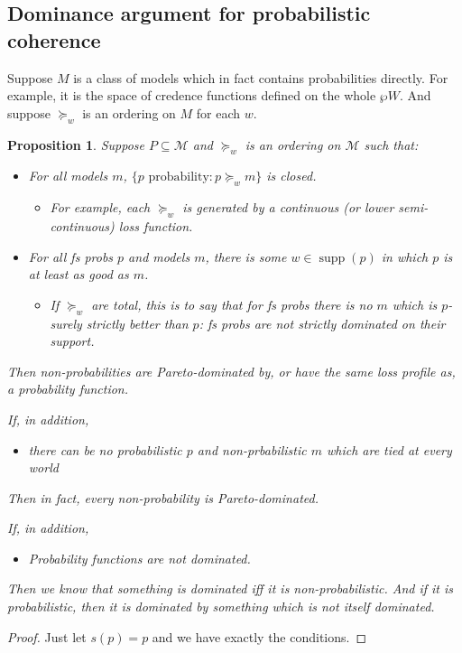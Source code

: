 \documentclass[11pt]{article}
\newtheorem{proposition}[theorem]{Proposition}
\theoremstyle{definition}
\theoremstyle{remark}
\newcommand{\M}{\mathcal M}
\newcommand{\supp}{\operatorname{supp}}
\begin{document}
\newpage\color{red}




\subsection{Dominance argument for probabilistic coherence}


Suppose $M$ is a class of models which in fact contains probabilities directly. For example, it is the space of credence functions defined on the whole $\wp{W}$. And suppose $\succeq_w$ is an ordering on $M$ for each $w$. 
\begin{proposition}
	Suppose $P\subseteq\M$ and $\succeq_w$ is an ordering on $\M$ such that:
	\begin{itemize}
		\item For all models $m$, $\{p\text{ probability} : p\succeq_w m\}$ is closed. 
		\begin{itemize}
			\item For example, each $\succeq_w$ is generated by a continuous (or lower semi-continuous) loss function.
		\end{itemize}
	\item For all fs probs $p$ and models $m$, there is some $w\in\supp(p)$ in which $p$ is at least as good as $m$. 
		\begin{itemize}
			\item If $\succeq_w$ are total, this is to say that for fs probs there is no $m$ which is $p$-surely strictly better than $p$: fs probs are not strictly dominated on their support. 
		\end{itemize}
	\end{itemize}
	Then non-probabilities are Pareto-dominated by, or have the same loss profile as, a probability function. 
	
	If, in addition, 
	\begin{itemize}
		\item there can be no probabilistic $p$ and non-prbabilistic $m$ which are tied at every world
	\end{itemize}
	Then in fact, every non-probability is Pareto-dominated. 
	
	If, in addition, \begin{itemize}
		\item Probability functions are not dominated. 
	\end{itemize} Then we know that something is dominated iff it is non-probabilistic. And if it is probabilistic, then it is dominated by something which is not itself dominated. 
\end{proposition}
\begin{proof}
	Just let $s(p)=p$ and we have exactly the conditions. 
\end{proof}
\end{document}
